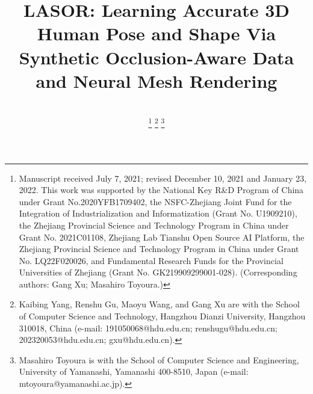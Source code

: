 \documentclass[journal]{IEEEtran}
\begin{document}
%
\title{LASOR: Learning Accurate 3D Human Pose and Shape Via Synthetic Occlusion-Aware Data and Neural Mesh Rendering}
%
%
%
\author{\\
\thanks{Manuscript received July 7, 2021; revised December 10, 2021 and January 23, 2022. This work was supported by the National Key R\&D Program of China under Grant No.2020YFB1709402, the NSFC-Zhejiang Joint Fund for the Integration of Industrialization and Informatization (Grant No. U1909210), the Zhejiang Provincial Science and Technology Program in China under Grant No. 2021C01108, Zhejiang Lab Tianshu Open Source AI Platform, the Zhejiang Provincial Science and Technology Program in China under Grant No. LQ22F020026, and Fundamental Research Funds for the Provincial Universities of Zhejiang (Grant No. GK219909299001-028). (Corresponding authors: Gang Xu; Masahiro Toyoura.)}
\thanks{Kaibing Yang, Renshu Gu, Maoyu Wang, and Gang Xu are with the School of Computer Science and Technology, Hangzhou Dianzi University, Hangzhou 310018, China (e-mail: 191050068@hdu.edu.cn; renshugu@hdu.edu.cn; 202320053@hdu.edu.cn; gxu@hdu.edu.cn).}
\thanks{Masahiro Toyoura is with the School of Computer Science and Engineering, University of Yamanashi, Yamanashi 400-8510, Japan (e-mail: mtoyoura@yamanashi.ac.jp).}}
\end{document}
